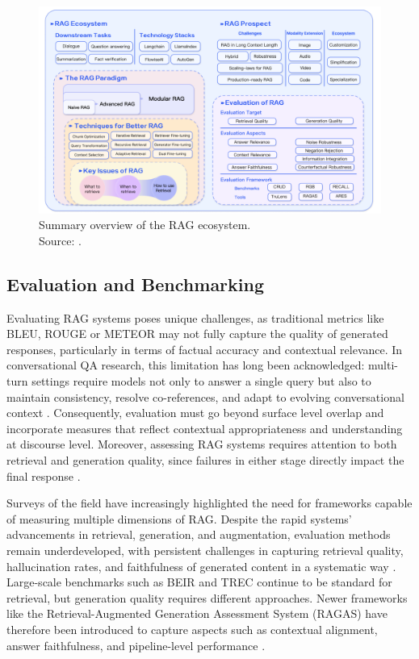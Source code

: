 \begin{spacing}{1.5}
\begin{figure}[H]
  \centering
  \includegraphics[width=\textwidth]{images/RAG_ecosystem.png} 
  \caption{Summary overview of the RAG ecosystem.\\
  \footnotesize{Source: \cite{gao_retrieval-augmented_2024}}.}
  \label{fig:summary_rag}
\end{figure}

\subsection{Evaluation and Benchmarking}\label{sec:eval_and_bench}
Evaluating RAG systems poses unique challenges, as traditional metrics like BLEU, ROUGE or METEOR may not fully capture the quality of generated responses, particularly in terms of factual accuracy and contextual relevance. In conversational QA research, this limitation has long been acknowledged: multi-turn settings require models not only to answer a single query but also to maintain consistency, resolve co-references, and adapt to evolving conversational context \citep{zaib_conversational_2022}. Consequently, evaluation must go beyond surface level overlap and incorporate measures that reflect contextual appropriateness and understanding at discourse level. Moreover, assessing RAG systems requires attention to both retrieval and generation quality, since failures in either stage directly impact the final response \citep{abeysinghe_challenges_2024}.

Surveys of the field have increasingly highlighted the need for frameworks capable of measuring multiple dimensions of RAG. Despite the rapid systems' advancements in retrieval, generation, and augmentation, evaluation methods remain underdeveloped, with persistent challenges in capturing retrieval quality, hallucination rates, and faithfulness of generated content in a systematic way \citep{gao_retrieval-augmented_2024}. Large-scale benchmarks such as BEIR \citep{thakur_beir_2021} and TREC \citep{voorhees_trec_2005} continue to be standard for retrieval, but generation quality requires different approaches. Newer frameworks like the Retrieval-Augmented Generation Assessment System (RAGAS) have therefore been introduced to capture aspects such as contextual alignment, answer faithfulness, and pipeline-level performance \citep{es_ragas_2023}.


\end{spacing}
